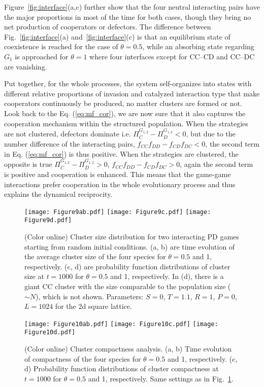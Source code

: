 \documentclass[showpacs,superscriptaddress,reprint,nofootinbib,amsmath,amssymb,aps,pre]{revtex4-1}
\begin{document}
Figure~\ref{fig:interface}(a,c) further show that the four neutral interacting pairs have the major proportions in most of the time for both cases, though they bring no net production of cooperators or defectors. The difference between Fig.~\ref{fig:interface}(a) and~\ref{fig:interface}(c) is that an equilibrium state of coexistence is reached for the case of $\theta=0.5$, while an absorbing state regarding $G_1$ is approached for $\theta=1$ where four interfaces except for CC--CD and CC--DC are vanishing.

Put together, for the whole processes, the system self-organizes into states with different relative proportions of invasion and catalyzed interaction type that make cooperators continuously be produced, no matter clusters are formed or not. 
Look back to the Eq. (\ref{eq:mf_cor}), we are now sure that it also captures the cooperation mechanism within the structured population. When the strategies are not clustered, defectors dominate i.e. $\Pi^{G_{1,2}}_C-\Pi^{G_{1,2}}_D<0$, but due to the number difference of the interacting pairs, $f_{CC}f_{DD}-f_{CD}f_{DC}<0$, the second term in Eq. (\ref{eq:mf_cor}) is thus positive. When the strategies are clustered, the opposite is true $\Pi^{G_{1,2}}_C-\Pi^{G_{1,2}}_D>0$, $f_{CC}f_{DD}-f_{CD}f_{DC}>0$, again the second term is positive and cooperation is enhanced. This means that the game-game interactions prefer cooperation in the whole evolutionary process and thus explains the dynamical reciprocity.

\begin{figure}[t]%
\centering
\texttt{[image: Figure9ab.pdf]}
\texttt{[image: Figure9c.pdf]}
\texttt{[image: Figure9d.pdf]}
\caption{(Color online)
Cluster size distribution for two interacting PD games starting from random initial conditions. 
(a, b) are time evolution of the average cluster size of the four species for $\theta=0.5$ and 1, respectively.
(c, d) are probability function distributions of cluster size at $t=1000$ for $\theta=0.5$ and 1, respectively. 
In (d), there is a giant CC cluster with the size comparable to the population size ($\sim N$), which is not shown.
Parameters: $S=0$, $T=1.1$, $R=1$, $P=0$, $L=1024$ for the 2d square lattice.
}
\label{fig:clustersize}
\end{figure}
 \begin{figure}[th]%
\centering
\texttt{[image: Figure10ab.pdf]}
\texttt{[image: Figure10c.pdf]}
\texttt{[image: Figure10d.pdf]}
\caption{(Color online)
Cluster compactness analysis. 
(a, b) Time evolution of compactness of the four species for $\theta=0.5$ and 1, respectively.
(c, d) Probability function distributions of cluster compactness at $t=1000$ for $\theta=0.5$ and 1, respectively. 
Same settings as in Fig.~\ref{fig:clustersize}.
}
\label{fig:compactness}
\end{figure}
\end{document}
